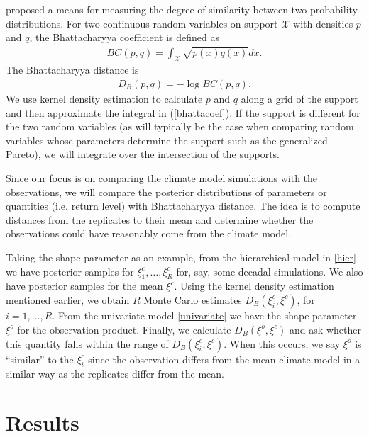 \documentclass[12pt]{article}
\begin{document}
\cite{bhattacharyya1943measure} proposed a means for measuring the degree of similarity between two probability distributions. For two continuous random variables on support $\mathcal{X}$ with densities $p$ and $q$, the Bhattacharyya coefficient is defined as
\begin{align}
BC(p,q)=\int_\mathcal{X} \sqrt{p(x)q(x)} dx. \label{bhattacoef}
\end{align}
The Bhattacharyya distance is 
\begin{align}
D_B(p,q)=-\log BC(p,q).
\end{align}
We use kernel density estimation to calculate $p$ and $q$ along a grid of the support and then approximate the integral in (\ref{bhattacoef}). If the support is different for the two random variables (as will typically be the case when comparing random variables whose parameters determine the support such as the generalized Pareto), we will integrate over the intersection of the supports.

Since our focus is on comparing the climate model simulations with the observations, we will compare the posterior distributions of parameters or quantities (i.e. return level) with Bhattacharyya distance. The idea is to compute distances from the replicates to their mean and determine whether the observations could have reasonably come from the climate model.

Taking the shape parameter as an example, from the hierarchical model in \ref{hier} we have posterior samples for $\xi_1^c,\ldots,\xi_R^c$ for, say, some decadal simulations. We also have posterior samples for the mean $\xi^c$. Using the kernel density estimation mentioned earlier, we obtain $R$ Monte Carlo estimates $D_B(\xi_i^c, \xi^c)$, for $i=1,\ldots,R$. From the univariate model \ref{univariate} we have the shape parameter $\xi^o$ for the observation product. Finally, we calculate $D_B(\xi^o, \xi^c)$ and ask whether this quantity falls within the range of $D_B(\xi_i^c, \xi^c)$. When this occurs, we say $\xi^o$ is ``similar'' to the $\xi_i^c$ since the observation differs from the mean climate model in a similar way as the replicates differ from the mean.

\section{Results}
\label{results}
\end{document}
